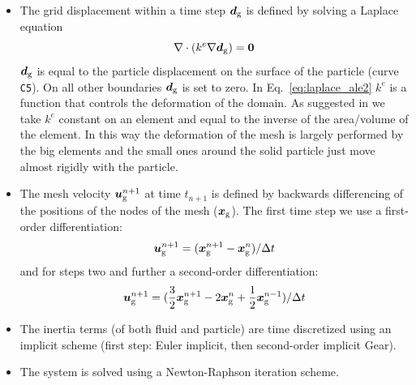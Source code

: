 \begin{itemize}
\begin{figure}[p!]
{    Using the new velocity of the particle a corrected position of the particle
    is computed with a trapezoidal rule.}
    \label{fig:particle_inertia_predcor}
\end{figure}
   The advantages of the predictor-corrector scheme are that the current
   velocity is used in the particle position and that it can be easily extended
   to problems where the updating of the interface is more complicated (see,
   for example Sec.~\ref{sec:swellNewtonian}). A disadvantage is that the
   position of the particle-fluid interface does not coincide with the mesh
   used for computing the velocities.  
   \item The grid displacement within a time step $\boldsymbol{d}_\text{g}$
    is defined by solving a Laplace equation
   \begin{equation}
      \nabla\cdot(k^e\nabla\boldsymbol{d}_\text{g})=\boldsymbol{0} \label{eq:laplace_ale2}
   \end{equation}
     $\boldsymbol{d}_\text{g}$ is equal to the particle displacement
     on the surface
     of the particle (curve \texttt{C5}). On all other boundaries $\boldsymbol{d}_\text{g}$ is set to zero. In Eq.~\eqref{eq:laplace_ale2} 
   $k^e$ is a function that controls the deformation of the domain.
   As suggested in \cite{Hu2001} we take $k^e$ 
   constant on an element and equal to the inverse of the
     area/volume of the element. In this way the deformation of the mesh is
largely performed by the big elements and the small ones around the solid
particle just move almost rigidly with the particle.
   \item The mesh velocity $\boldsymbol{u}^{n+1}_\text{g}$ at time 
    $t_{n+1}$ is defined by backwards
   differencing of the positions of the nodes of the mesh ($\boldsymbol{x}_\text{g}$).
   The first time step we use a first-order differentiation:
\begin{equation}
  \boldsymbol{u}^{n+1}_\text{g}=(\boldsymbol{x}^{n+1}_\text{g} - \boldsymbol{x}^{n}_\text{g})/\Delta t
\end{equation}
   and for steps two and further a second-order differentiation:
\begin{equation}
  \boldsymbol{u}^{n+1}_\text{g}=(\frac32\boldsymbol{x}^{n+1}_\text{g} - 2\boldsymbol{x}^{n}_\text{g}
            +\frac12\boldsymbol{x}^{n-1}_\text{g})/\Delta t
\end{equation}
  \item The inertia terms (of both fluid and particle)
        are time discretized using an implicit scheme (first
        step: Euler implicit, then second-order implicit Gear).
  \item The system is solved using a Newton-Raphson iteration scheme.
\end{itemize}

